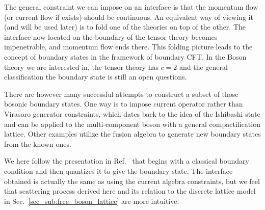 
The general constraint we can impose on an interface is that the momentum flow (or current flow if exists) should be continuous. An equivalent way of viewing it (and will be used later) is to fold one of the theories on top of the other. The interface now located on the boundary of the tensor theory becomes impenetrable, and momentum flow ends there. This folding picture leads to the concept of boundary states in the framework of boundary CFT\cite{cardy_boundary_2004,cardy_conformal_1984}. In the Boson theory we are interested in, the tensor theory has $c = 2$ and the general classification the boundary state is still an open questions\cite{affleck_quantum_2001}. 

There are however many successful attempts to construct a subset of those bosonic boundary states. One way is to impose current operator rather than Virasoro generator constraints, which dates back to the idea of the Ishibashi state\cite{ishibashi_boundary_1989} and can be applied to the multi-component boson with a general compactification lattice\cite{affleck_quantum_2001,oshikawa_boundary_2010,quella_reflection_2007}. Other examples utilize the fusion algebra to generate new boundary states from the known ones\cite{affleck_quantum_2001,bachas_fusion_2008}. 

We here follow the presentation in Ref.~ that begins with a classical boundary condition and then quantizes it to give the boundary state. The interface obtained is actually the same as using the current algebra constraints\cite{affleck_quantum_2001,oshikawa_boundary_2010,quella_reflection_2007}, but we feel that scattering process derived here and its relation to the discrete lattice model in Sec.~\ref{sec_sub:free_boson_lattice} are more intuitive. 

